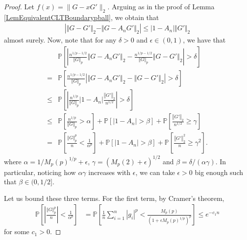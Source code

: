 \documentclass[10pt]{amsart}
\newcounter{theor}
\numberwithin{equation}{section}
\begin{document}
\begin{proof}

Let $f(x)=\|G-xG'\|_2$. Arguing as in the proof of Lemma \ref{LemEquivalentCLTBoundarypball}, we obtain that
\begin{align*}
\left| \Vert G - G' \Vert_2 - \Vert G - A_n G' \Vert_2 \right|  \leq  | 1- A_n| \Vert G' \Vert_2
\end{align*}
almost surely.
Now, note that for any $\delta >0$ and $\epsilon \in (0,1)$, we have that
\begin{align*}
& \mathbb{P} \left[ \left|  \frac{n^{1/p - 1/2}}{\Vert G \Vert _p} \left\Vert  G - A_n G' \right\Vert_2 - 
\frac{n^{1/p - 1/2}}{\Vert G \Vert _p} \left\Vert  G - G' \right\Vert_2
 \right|  > \delta \right] 
 \\
 = &  \mathbb{P} \left[  \frac{n^{1/p - 1/2}}{\Vert G \Vert _p} 
 \left|  \left\Vert  G - A_n G' \right\Vert_2 - 
 \left\Vert  G - G' \right\Vert_2
 \right|  > \delta \right] 
 \\
\leq &  \mathbb{P} \left[ \left|  \frac{n^{1/p}}{\Vert G \Vert _p}
 | 1- A_n | \frac{  \left\Vert G'  \right\Vert _2   }{n^{1/2}} 
 \right|  > \delta \right]
 \\
\leq  &  \mathbb{P} \left[   \frac{n^{1/p}}{\Vert G \Vert _p}   > \alpha   \right]
 +  \mathbb{P} \left[ \left|  1-A_n \right| > \beta   \right]
 + \mathbb{P} \left[   \frac{  \left\Vert G'  \right\Vert_2 }{n^{1/2}}   \geq  \gamma   \right]
 \\
= &  \mathbb{P} \left[   \frac{\Vert G \Vert _p ^p}{n}   < \frac{1}{\alpha^p}   \right]
 +  \mathbb{P} \left[ \left|  1-A_n \right| > \beta   \right]
 + \mathbb{P} \left[   \frac{  \left\Vert G'  \right\Vert_2 ^2   }{n}   \geq \gamma^2   \right] .
\end{align*}
where $\alpha = 1/ M_p(p)^{1/p} + \epsilon$, $\gamma = (M_p(2) + \epsilon)^{1/2}$ and $\beta = \delta / ( \alpha \gamma ) $. In particular, noticing how $\alpha \gamma $ increases with $\epsilon$, we can take $\epsilon>0$ big enough such that $\beta \in (0, 1/2]$.


\quad

\quad


Let us bound these three terms. For the first term, by Cramer's theorem,
\begin{align*}
\mathbb{P} \left[ \left|  \frac{\Vert G \Vert _p ^p}{n} \right|  < \frac{1}{\alpha ^p}   \right]  & = \mathbb{P} \left[   \frac{1}{n} \sum _{i=1}^n \left| g_i  \right|^p   <  \frac{M_p(p)}{\left( 1 + \epsilon M_p(p)^{1/p} \right)^p}   \right] \leq e^{-c_1 n}
\end{align*}
for some $c_1>0$.



\end{proof}
\end{document}
